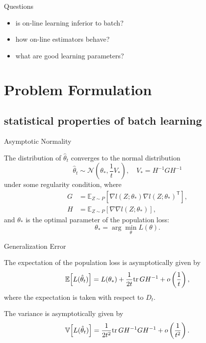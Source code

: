 \documentclass[fleqn,aspectratio=1610]{beamer}
\begin{document}
\begin{frame}[label={sec:org60008df}]{Questions}
\begin{itemize}
\item is on-line learning inferior to batch?
\item how on-line estimators behave?
\item what are good learning parameters?
\end{itemize}
\end{frame}
\section{Problem Formulation}
\label{sec:orgf82c955}
\subsection{statistical properties of batch learning}
\label{sec:org7f5c5c4}
\begin{frame}[label={sec:org7adec41}]{Asymptotic Normality}
\begin{lemma}[Godambe, 1991]\label{sec:org852cdc0}
\nocite{Godambe1991}
The distribution of \(\hat{\theta}_{t}\) converges
to the normal distribution 
\begin{equation}
  \hat{\theta}_{t}
  \sim \mathcal{N}\left(\theta_{*},\frac{1}{t}V_{*}\right),\quad
  V_{*}=H^{-1}GH^{-1}
\end{equation}
under some regularity condition, where
\begin{align}
  G
  &=\mathbb{E}_{Z\sim P}
    \left[
    \nabla l(Z;\theta_{*}) \nabla l(Z;\theta_{*})^{\mathsf{T}}
    \right],\\
  H
  &=\mathbb{E}_{Z\sim P}
    \left[
    \nabla\nabla l(Z;\theta_{*})
    \right],
\end{align}
and \(\theta_{*}\) is the optimal parameter of the population loss:
\begin{equation}
  \theta_{*}
  = \arg\min_\theta L(\theta).
\end{equation}
\end{lemma}
\end{frame}
\begin{frame}[label={sec:orgef212f9}]{Generalization Error}
\begin{theorem}[]\label{sec:orge76fc8e}
The expectation of the population loss is asymptotically given by
\begin{equation}
  \mathbb{E}\Bigl[L(\hat\theta_{t})\Bigr]
  =L(\theta_*)
  +\frac{1}{2t}\mathrm{tr}\, GH^{-1}
  +o\left(\frac{1}{t}\right),
\end{equation}
where the expectation is taken with respect to \(D_{t}\).

The variance is asymptotically given by
\begin{equation}
  \mathbb{V}\Bigl[L(\hat\theta_{t})\Bigr]
  =\frac{1}{2t^2}\mathrm{tr}\, GH^{-1}GH^{-1}
  +o\left(\frac{1}{t^2}\right).
\end{equation}
\end{theorem}
\end{frame}
\end{document}
